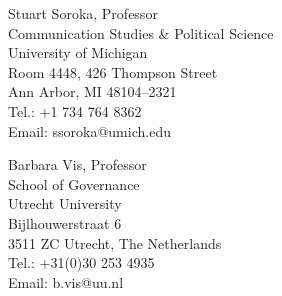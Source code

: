 \documentclass[letterpaper,fontsize=10pt]{scrartcl}
\begin{document}
	\begin{minipage}[t]{0.54\textwidth}
	Stuart Soroka, Professor\\
	Communication Studies \& Political Science\\
	University of Michigan\\
	Room 4448, 426 Thompson Street\\
	Ann Arbor, MI 48104–2321\\
	Tel.: +1 734 764 8362\\
	Email: ssoroka@umich.edu\\
\end{minipage}
\begin{minipage}[t]{0.46\textwidth}
	Barbara Vis, Professor\\
	School of Governance\\
	Utrecht University\\
	Bijlhouwerstraat 6\\
	3511 ZC Utrecht, The Netherlands\\
	Tel.: +31(0)30 253 4935\\
	Email: b.vis@uu.nl
\end{minipage}
\end{document}
